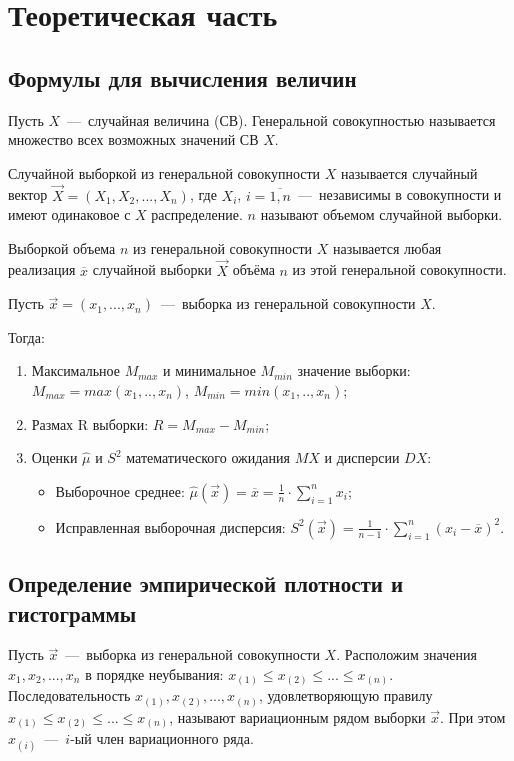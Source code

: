 \chapter{Теоретическая часть}

\section{Формулы для вычисления величин}

Пусть $X$~---~случайная величина (СВ). Генеральной совокупностью называется множество всех возможных значений СВ $X$. 

Случайной выборкой из генеральной совокупности $X$ называется случайный вектор $\overrightarrow{X} = (X_1, X_2, ..., X_n)$, где $X_i$, $i = \overline{1, n}$~---~независимы в совокупности и имеют одинаковое с $X$ распределение. $n$ называют объемом случайной выборки.

Выборкой объема $n$ из генеральной совокупности $X$ называется любая реализация $\overline{x}$ случайной выборки $\overrightarrow{X}$ объёма $n$ из этой генеральной совокупности.

Пусть $\vec x=(x_1, ..., x_n)$~---~выборка из генеральной совокупности $X$.

Тогда:

\begin{enumerate}
 \item Максимальное $M_{max}$ и минимальное $M_{min}$ значение выборки: $M_{max} = max(x_1, .., x_n)$, $M_{min} = min(x_1, .., x_n)$;
 \item Размах R выборки: $R = M_{max} - M_{min}$;
 \item Оценки $\hat\mu$ и $S^2$ математического ожидания $MX$ и дисперсии $DX$:
  \begin{itemize}
   \item Выборочное среднее: $\hat\mu(\vec{x}) = \overline x = \frac{1}{n} \cdot \sum\limits_{i=1}^{n} x_i$;
   \item Исправленная выборочная дисперсия: $S^2(\vec{x}) = \frac{1}{n - 1} \cdot \sum\limits_{i=1}^{n} (x_i - \overline x)^2$.
  \end{itemize}
\end{enumerate}

\section{Определение эмпирической плотности и гистограммы}



Пусть $\vec x$~---~выборка из генеральной совокупности $X$. Расположим значения $x_1, x_2, ..., x_n$ в порядке неубывания: $x_{(1)} \leq x_{(2)} \leq ... \leq x_{(n)}$. Последовательность $x_{(1)}, x_{(2)}, ..., x_{(n)}$, удовлетворяющую правилу $x_{(1)} \leq x_{(2)} \leq ... \leq x_{(n)}$, называют вариационным рядом выборки $\vec x$. При этом $x_{(i)}$~---~$i$-ый член вариационного ряда.


